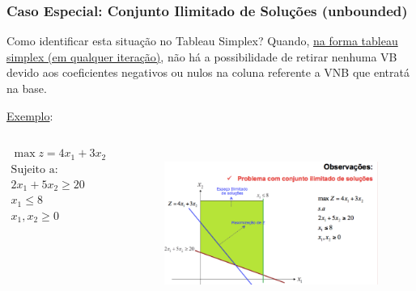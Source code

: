 \documentclass{beamer}
\begin{document}
\begin{frame}
	\frametitle{Caso Especial: Conjunto Ilimitado de Soluções (unbounded)}
	\begin{block}{Como identificar esta situação no Tableau Simplex?}
		Quando, {\color{red} \underline{na forma tableau simplex (em qualquer iteração)}}, não há a possibilidade de retirar nenhuma VB devido aos coeficientes negativos ou nulos na coluna referente a VNB que entratá na base.
	\end{block}
	\underline{Exemplo}:
	\begin{columns}
		\begin{column}{4cm}
			\begin{mdframed}[backgroundcolor=black!10]
				$	\begin{matrix}
						\max z = 4x_1 + 3x_2\\
						\text{Sujeito a:} \\
						2x_1 + 5x_2 \ge 20 \\
						x_1 \le 8 \\
						x_1, x_2 \ge 0 \\
					\end{matrix}
				$
			\end{mdframed}
		\end{column} \pause
		\begin{column}{6.5cm}
			\includegraphics[width=7cm,height=5cm]{prob_ilimitado.png}
		\end{column}
	\end{columns}
\end{frame}
\end{document}
